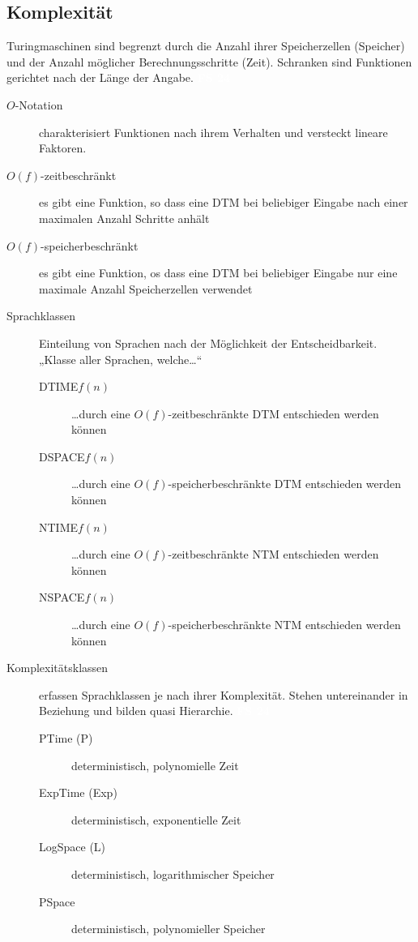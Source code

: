 \documentclass[a4paper,10pt]{article}
\newcommand{\vl}[1]{\colorbox{vl}{\textcolor{white}{\small\textbf{#1}}}}
\begin{document}
    \newpage
    \subsection{Komplexität}
    Turingmaschinen sind begrenzt durch die Anzahl ihrer Speicherzellen (Speicher) und der Anzahl möglicher Berechnungsschritte (Zeit).
    Schranken sind Funktionen gerichtet nach der Länge der Angabe. \vl{FS 24}

    \begin{description}
        \item[$O$-Notation] charakterisiert Funktionen nach ihrem Verhalten und versteckt lineare Faktoren.
        \item[$O(f)$-zeitbeschränkt] es gibt eine Funktion, so dass eine DTM bei beliebiger Eingabe nach einer maximalen Anzahl Schritte anhält
        \item[$O(f)$-speicherbeschränkt] es gibt eine Funktion, os dass eine DTM bei beliebiger Eingabe nur eine maximale Anzahl Speicherzellen verwendet

        \item[Sprachklassen] Einteilung von Sprachen nach der Möglichkeit der Entscheidbarkeit. \\
            „Klasse aller Sprachen, welche…“
            \begin{description}
                \item[DTIME$f(n)$] …durch eine $O(f)$-zeitbeschränkte DTM entschieden werden können
                \item[DSPACE$f(n)$] …durch eine $O(f)$-speicherbeschränkte DTM entschieden werden können

                \item[NTIME$f(n)$] …durch eine $O(f)$-zeitbeschränkte NTM entschieden werden können
                \item[NSPACE$f(n)$] …durch eine $O(f)$-speicherbeschränkte NTM entschieden werden können
            \end{description}

        \item[Komplexitätsklassen] erfassen Sprachklassen je nach ihrer Komplexität.
            Stehen untereinander in Beziehung und bilden quasi Hierarchie. \vl{FS 24}
            \begin{description}
                \item[PTime (P)] deterministisch, polynomielle Zeit
                \item[ExpTime (Exp)] deterministisch, exponentielle Zeit
                \item[LogSpace (L)] deterministisch, logarithmischer Speicher
                \item[PSpace] deterministisch, polynomieller Speicher


\end{description}
\end{description}
\end{document}
